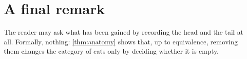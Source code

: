 \section{A final remark}

The reader may ask what has been gained by recording the head and the tail at
all. Formally, nothing: \cref{thm:anatomy} shows that, up to equivalence,
removing them changes the category of cats only by deciding whether it is
empty.
